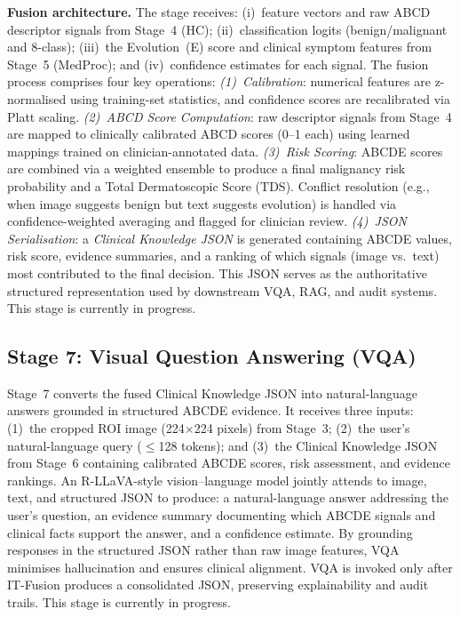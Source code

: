 \documentclass[conference]{IEEEtran}
\begin{document}
\textbf{Fusion architecture.} The stage receives: (i)~feature vectors
and raw ABCD descriptor signals from Stage~4 (HC); (ii)~classification
logits (benign/malignant and 8-class); (iii)~the Evolution~(E) score
and clinical symptom features from Stage~5 (MedProc); and
(iv)~confidence estimates for each signal. The fusion process
comprises four key operations: \emph{(1)~Calibration}: numerical
features are z-normalised using training-set statistics, and confidence
scores are recalibrated via Platt scaling. \emph{(2)~ABCD Score
Computation}: raw descriptor signals from Stage~4 are mapped to
clinically calibrated ABCD scores (0--1 each) using learned mappings
trained on clinician-annotated data. \emph{(3)~Risk Scoring}: ABCDE
scores are combined via a weighted ensemble to produce a final
malignancy risk probability and a Total Dermatoscopic Score (TDS).
Conflict resolution (e.g., when image suggests benign but text
suggests evolution) is handled via confidence-weighted averaging and
flagged for clinician review. \emph{(4)~JSON Serialisation}: a
\emph{Clinical Knowledge JSON} is generated containing ABCDE values,
risk score, evidence summaries, and a ranking of which signals (image
vs.\ text) most contributed to the final decision. This JSON serves as
the authoritative structured representation used by downstream VQA,
RAG, and audit systems. This stage is currently in progress.

\subsection{Stage 7: Visual Question Answering (VQA)}

Stage~7 converts the fused Clinical Knowledge JSON into natural-language
answers grounded in structured ABCDE evidence. It receives three inputs:
(1)~the cropped ROI image (224$\times$224 pixels) from Stage~3; (2)~the
user's natural-language query ($\leq$128 tokens); and (3)~the Clinical
Knowledge JSON from Stage~6 containing calibrated ABCDE scores, risk
assessment, and evidence rankings. An R-LLaVA-style vision--language
model jointly attends to image, text, and structured JSON to produce:
a natural-language answer addressing the user's question, an evidence
summary documenting which ABCDE signals and clinical facts support the
answer, and a confidence estimate. By grounding responses in the
structured JSON rather than raw image features, VQA minimises hallucination
and ensures clinical alignment. VQA is invoked only after IT-Fusion produces
a consolidated JSON, preserving explainability and audit trails. This stage
is currently in progress.
\end{document}
